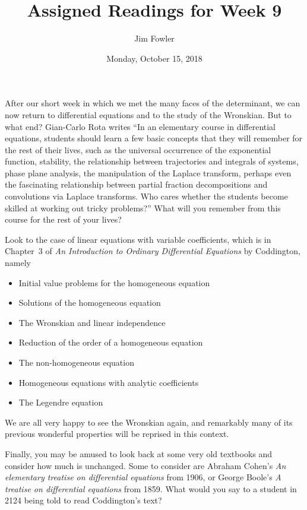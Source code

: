 \documentclass{homework}
\author{Jim Fowler}
\title{Assigned Readings for Week 9}
\date{Monday, October 15, 2018}
\begin{document}
\maketitle

After our short week in which we met the many faces of the
determinant, we can now return to differential equations and to the
study of the Wronskian.  But to what end?  Gian-Carlo Rota writes ``In
an elementary course in differential equations, students should learn
a few basic concepts that they will remember for the rest of their
lives, such as the universal occurrence of the exponential function,
stability, the relationship between trajectories and integrals of
systems, phase plane analysis, the manipulation of the Laplace
transform, perhaps even the fascinating relationship between partial
fraction decompositions and convolutions via Laplace transforms.  Who
cares whether the students become skilled at working out tricky
problems?''  What will you remember from this course for the rest of
your lives?

Look to the case of linear equations with variable coefficients, which
is in Chapter~3 of \textit{An Introduction to Ordinary Differential
  Equations} by Coddington, namely
\begin{itemize}
\item {} Initial value problems for the homogeneous equation
\item {} Solutions of the homogeneous equation %
\item {} The Wronskian and linear independence %
\item {} Reduction of the order of a homogeneous equation %
\item {} The non-homogeneous equation %
\item {} Homogeneous equations with analytic coefficients %
\item {} The Legendre equation %
\end{itemize}
We are all very happy to see the Wronskian again, and remarkably many
of its previous wonderful properties will be reprised in this context.

Finally, you may be amused to look back at some very old textbooks and
consider how much is unchanged.  Some to consider are Abraham Cohen's
\textit{An elementary treatise on differential equations} from 1906,
or George Boole's \textit{A treatise on differential equations} from
1859.  What would you say to a student in 2124 being told to read
Coddington's text?
\end{document}
